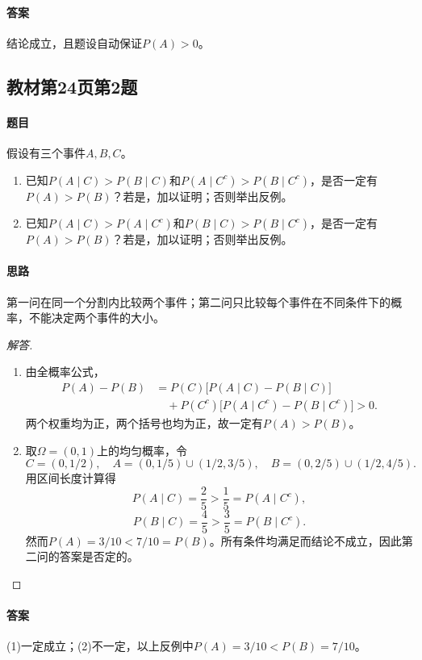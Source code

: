 \paragraph{答案}结论成立，且题设自动保证$P(A)>0$。

\subsection{教材第24页第2题}\label{ex:w03-t242}
\paragraph{题目}
假设有三个事件$A,B,C$。
\begin{enumerate}[label=(\arabic*)]
\item 已知$P(A\mid C)>P(B\mid C)$和$P(A\mid C^c)>P(B\mid C^c)$，是否一定有$P(A)>P(B)$？若是，加以证明；否则举出反例。
\item 已知$P(A\mid C)>P(A\mid C^c)$和$P(B\mid C)>P(B\mid C^c)$，是否一定有$P(A)>P(B)$？若是，加以证明；否则举出反例。
\end{enumerate}
\paragraph{思路}第一问在同一个分割内比较两个事件；第二问只比较每个事件在不同条件下的概率，不能决定两个事件的大小。
\begin{proof}[解答]
\begin{enumerate}[label=(\arabic*)]
\item 由全概率公式，
\begin{align*}
P(A)-P(B)
&=P(C)\bigl[P(A\mid C)-P(B\mid C)\bigr]\\
&\quad+P(C^c)\bigl[P(A\mid C^c)-P(B\mid C^c)\bigr]>0.
\end{align*}
两个权重均为正，两个括号也均为正，故一定有$P(A)>P(B)$。
\item 取$\Omega=(0,1)$上的均匀概率，令
\[C=(0,1/2),\quad A=(0,1/5)\cup(1/2,3/5),\quad B=(0,2/5)\cup(1/2,4/5).\]
用区间长度计算得
\[P(A\mid C)=\frac25>\frac15=P(A\mid C^c),\]
\[P(B\mid C)=\frac45>\frac35=P(B\mid C^c).\]
然而$P(A)=3/10<7/10=P(B)$。所有条件均满足而结论不成立，因此第二问的答案是否定的。
\end{enumerate}
\end{proof}
\paragraph{答案}(1)一定成立；(2)不一定，以上反例中$P(A)=3/10<P(B)=7/10$。

